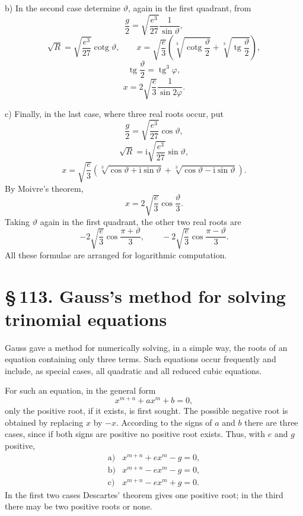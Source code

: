 \documentclass[11pt]{article}
\providecommand{\cotg}{\operatorname{cotg}}
\providecommand{\ii}{\mathrm{i}}
\providecommand{\tg}{\operatorname{tg}}
\providecommand{\sect}[2]{\section*{\S\,#1. #2}}
\begin{document}
b) In the second case determine $\vartheta$, again in the first quadrant, from
\begin{equation}
        \frac g2=\sqrt{\frac{e^3}{27}}\frac1{\sin\vartheta},
\tag{7}
\end{equation}
\[
        \sqrt R=\sqrt{\frac{e^3}{27}}\cotg\vartheta,\qquad
        x=\sqrt{\frac e3}\left(
        \sqrt[3]{\cotg\frac{\vartheta}{2}}
        +\sqrt[3]{\tg\frac{\vartheta}{2}}\right),
\]
\begin{equation}
        \tg\frac{\vartheta}{2}=\tg^3\varphi,
\tag{8}
\end{equation}
\begin{equation}
        x=2\sqrt{\frac e3}\frac1{\sin 2\varphi}.
\tag{9}
\end{equation}

c) Finally, in the last case, where three real roots occur, put
\begin{equation}
        \frac g2=\sqrt{\frac{e^3}{27}}\cos\vartheta,
\tag{10}
\end{equation}
\[
        \sqrt R=\ii\sqrt{\frac{e^3}{27}}\sin\vartheta,
\]
\[
        x=\sqrt{\frac e3}\left(
        \sqrt[3]{\cos\vartheta+\ii\sin\vartheta}
        +\sqrt[3]{\cos\vartheta-\ii\sin\vartheta}\right).
\]
By Moivre's theorem,
\begin{equation}
        x=2\sqrt{\frac e3}\cos\frac{\vartheta}{3}.
\tag{11}
\end{equation}
Taking $\vartheta$ again in the first quadrant, the other two real roots are
\[
        -2\sqrt{\frac e3}\cos\frac{\pi+\vartheta}{3},
        \qquad
        -2\sqrt{\frac e3}\cos\frac{\pi-\vartheta}{3}.
\]
All these formulae are arranged for logarithmic computation.

\sect{113}{Gauss's method for solving trinomial equations}

Gauss gave a method for numerically solving, in a simple way, the roots of an equation containing only three terms. Such equations occur frequently and include, as special cases, all quadratic and all reduced cubic equations.

For such an equation, in the general form
\begin{equation}
        x^{m+n}+ax^m+b=0,
\tag{1}
\end{equation}
only the positive root, if it exists, is first sought. The possible negative root is obtained by replacing $x$ by $-x$. According to the signs of $a$ and $b$ there are three cases, since if both signs are positive no positive root exists. Thus, with $e$ and $g$ positive,
\[
\begin{array}{ll}
\mathrm{a)}&x^{m+n}+ex^m-g=0,\\
\mathrm{b)}&x^{m+n}-ex^m-g=0,\\
\mathrm{c)}&x^{m+n}-ex^m+g=0.
\end{array}
\]
In the first two cases Descartes' theorem gives one positive root; in the third there may be two positive roots or none.
\end{document}

